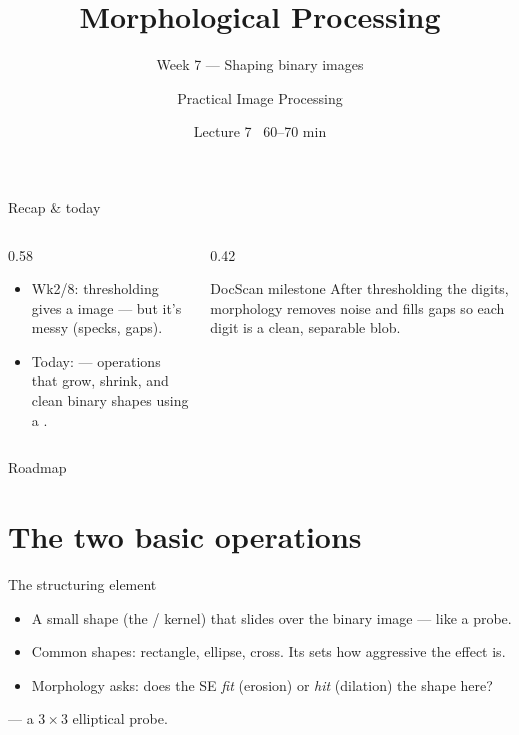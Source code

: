 \documentclass[10pt,aspectratio=169]{beamer}
\title{Morphological Processing}
\subtitle{Week 7 — Shaping binary images}
\author{Practical Image Processing}
\date{Lecture 7 \textbullet\ 60--70 min}
\begin{document}
\maketitle

\begin{frame}{Recap \& today}
  \begin{columns}[T]
    \begin{column}{0.58\textwidth}
      \begin{itemize}
        \item Wk2/8: thresholding gives a  image — but it's messy (specks, gaps).
        \item \alert{Today:}  — operations that grow, shrink, and clean binary
              shapes using a .
      \end{itemize}
    \end{column}
    \begin{column}{0.42\textwidth}
      \begin{alertblock}{DocScan milestone}
        After thresholding the digits, morphology removes noise and fills gaps so each digit is
        a clean, separable blob.
      \end{alertblock}
    \end{column}
  \end{columns}
\end{frame}

\begin{frame}{Roadmap}\tableofcontents\end{frame}

\section{The two basic operations}

\begin{frame}{The structuring element}
  \begin{itemize}
    \item A small shape (the  / kernel) that slides over the binary image — like a probe.
    \item Common shapes: rectangle, ellipse, cross. Its  sets how aggressive the effect is.
    \item Morphology asks: does the SE \emph{fit} (erosion) or \emph{hit} (dilation) the shape here?
  \end{itemize}
  \begin{mathbox}
     — a $3\times3$ elliptical probe.
  \end{mathbox}
\end{frame}
\end{document}

